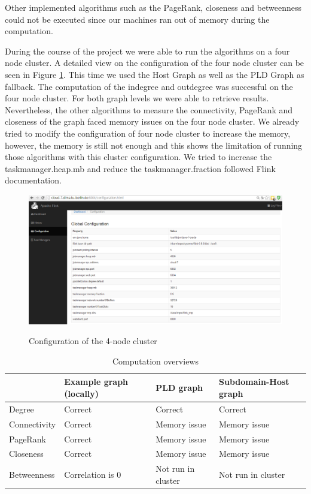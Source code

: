Other implemented algorithms such as the PageRank, closeness and betweenness could not be executed since our machines ran out of memory during the computation.

During the course of the project we were able to run the algorithms on a four node cluster. A detailed view on the configuration of the four node cluster can be seen in Figure \ref{fig6a}. This time we used the Host Graph as well as the PLD Graph as fallback. The computation of the indegree and outdegree was successful on the four node cluster. For both graph levels we were able to retrieve results. Nevertheless, the other algorithms to measure the connectivity, PageRank and closeness of the graph faced memory issues on the four node cluster. We already tried to modify the configuration of four node cluster to increase the memory, however, the memory is still not enough and this shows the limitation of running those algorithms with this cluster configuration. We tried to increase the taskmanager.heap.mb and reduce the taskmanager.fraction followed Flink documentation.

\begin{figure}[H]
	\begin{center}
		\label{fig6a}		
		\includegraphics[width=1.0\textwidth]{fig6a}	
		\caption{Configuration of the 4-node cluster}	
	\end{center}
\end{figure}

\begin{table}[H]
	\caption{Computation overviews}
	\label{t3}
	\begin{center}
		\begin{tabular}{|l|l|l|l|}
			\hline		
				&Example graph (locally)	&PLD graph	&Subdomain-Host graph \\ \hline
			Degree	&Correct	&Correct	&Correct \\ \hline
			Connectivity	&Correct	&Memory issue	&Memory issue	\\ \hline
			PageRank	&Correct	&Memory issue	&Memory issue	\\ \hline
			Closeness	&Correct	&Memory issue	&Memory issue	\\ \hline
			Betweenness	&Correlation is 0	&Not run in cluster	&Not run in cluster	\\ \hline
		\end{tabular}
	\end{center}
\end{table}

